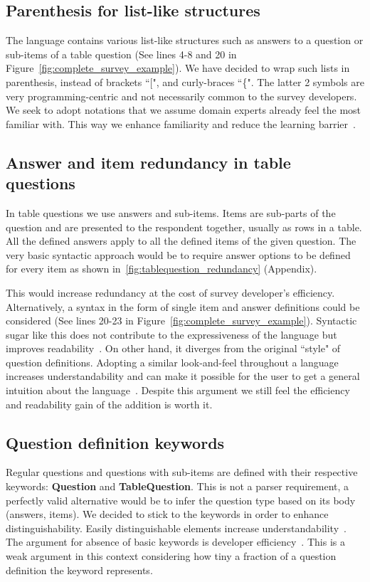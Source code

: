 \documentclass[runningheads,a4paper]{llncs}
\begin{document}
\subsection{Parenthesis for list-like structures}
The language contains various list-like structures such as answers to a question or sub-items of a table question (See lines 4-8 and 20 in Figure~\ref{fig:complete_survey_example}). We have decided to wrap such lists in parenthesis, instead of brackets ``[", and curly-braces ``\{". The latter 2 symbols are very programming-centric and not necessarily common to the survey developers. We seek to adopt notations that we assume domain experts already feel the most familiar with. This way we enhance familiarity and reduce the learning barrier~\cite{karsai}.

\subsection{Answer and item redundancy in table questions}
In table questions we use answers and sub-items. Items are sub-parts of the question and are presented to the respondent together, usually as rows in a table. All the defined answers apply to all the defined items of the given question. The very basic syntactic approach would be to require answer options to be defined for every item as shown in~\ref{fig:tablequestion_redundancy} (Appendix).

This would increase redundancy at the cost of survey developer's efficiency.  Alternatively, a syntax in the form of single item and answer definitions could be considered (See lines 20-23 in Figure~\ref{fig:complete_survey_example}). Syntactic sugar like this does not contribute to the expressiveness of the language but improves readability~\cite{karsai}. On other hand, it diverges from the original ``style" of question definitions. Adopting a similar look-and-feel throughout a language increases understandability and can make it possible for the user to get a general intuition about the language~\cite{karsai}. Despite this argument we still feel the efficiency and readability gain of the addition is worth it.

\subsection{Question definition keywords}
Regular questions and questions with sub-items are defined with their respective keywords: \textbf{Question} and \textbf{TableQuestion}. This is not a parser requirement, a perfectly valid alternative would be to infer the question type based on its body (answers, items). We decided to stick to the keywords in order to enhance distinguishability. Easily distinguishable elements increase understandability~\cite{karsai}. The argument for absence of basic keywords is developer efficiency~\cite{karsai}. This is a weak argument in this context considering how tiny a fraction of a question definition the keyword represents.
\end{document}
